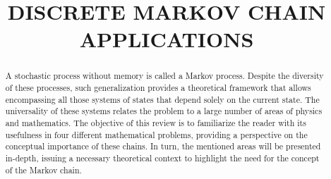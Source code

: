 \documentclass[12pt]{article}
\numberwithin{equation}{section}
\begin{document}
\title{DISCRETE MARKOV CHAIN APPLICATIONS}








\begin{abstract} 
A stochastic process without memory is called a Markov process. Despite the diversity of these processes, such generalization provides a theoretical framework that allows encompassing all those systems of states that depend solely on the current state. The universality of these systems relates the problem to a large number of areas of physics and mathematics. The objective of this review is to familiarize the reader with its usefulness in four different mathematical problems, providing a perspective on the conceptual importance of these chains. In turn, the mentioned areas will be presented in-depth, issuing a necessary theoretical context to highlight the need for the concept of the Markov chain.
\end{abstract}

\maketitle
\end{document}

